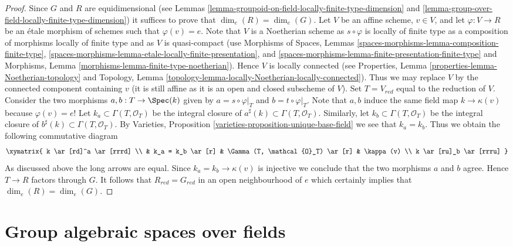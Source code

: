 \begin{proof}
Since $G$ and $R$ are equidimensional (see
Lemmas \ref{lemma-groupoid-on-field-locally-finite-type-dimension} and
\ref{lemma-group-over-field-locally-finite-type-dimension})
it suffices to prove that $\dim_e(R) = \dim_e(G)$. Let $V$ be an affine scheme,
$v \in V$, and let $\varphi : V \to R$ be an \'etale morphism of schemes
such that $\varphi(v) = e$. Note that $V$ is a Noetherian scheme as
$s \circ \varphi$ is locally of finite type as a composition of morphisms
locally of finite type and as $V$ is quasi-compact (use
Morphisms of Spaces, Lemmas
\ref{spaces-morphisms-lemma-composition-finite-type},
\ref{spaces-morphisms-lemma-etale-locally-finite-presentation}, and
\ref{spaces-morphisms-lemma-finite-presentation-finite-type}
and
Morphisms, Lemma \ref{morphisms-lemma-finite-type-noetherian}).
Hence $V$ is locally connected (see
Properties, Lemma \ref{properties-lemma-Noetherian-topology}
and
Topology, Lemma \ref{topology-lemma-locally-Noetherian-locally-connected}).
Thus we may replace $V$ by the connected component containing $v$ (it
is still affine as it is an open and closed subscheme of $V$).
Set $T = V_{red}$ equal to the reduction of $V$. Consider the two
morphisms $a, b : T \to \Spec(k)$ given by
$a = s \circ \varphi|_T$ and $b = t \circ \varphi|_T$. Note that
$a, b$ induce the same field map $k \to \kappa(v)$ because $\varphi(v) = e$!
Let $k_a \subset \Gamma(T, \mathcal{O}_T)$ be the integral closure of
$a^\sharp(k) \subset \Gamma(T, \mathcal{O}_T)$. Similarly, let
$k_b \subset \Gamma(T, \mathcal{O}_T)$ be the integral closure of
$b^\sharp(k) \subset \Gamma(T, \mathcal{O}_T)$. By
Varieties, Proposition \ref{varieties-proposition-unique-base-field}
we see that $k_a = k_b$. Thus we obtain the following commutative diagram
$$
\xymatrix{
k \ar[rd]^a \ar[rrrd] \\
& k_a = k_b \ar[r] & \Gamma(T, \mathcal{O}_T) \ar[r] & \kappa(v) \\
k \ar[ru]_b \ar[rrru]
}
$$
As discussed above the long arrows are equal.
Since $k_a = k_b \to \kappa(v)$ is injective we conclude that
the two morphisms $a$ and $b$ agree. Hence $T \to R$ factors through $G$.
It follows that $R_{red} = G_{red}$ in an open neighbourhood of $e$
which certainly implies that $\dim_e(R) = \dim_e(G)$.
\end{proof}






\section{Group algebraic spaces over fields}
\label{section-group-algebraic-spaces-over-fields}

